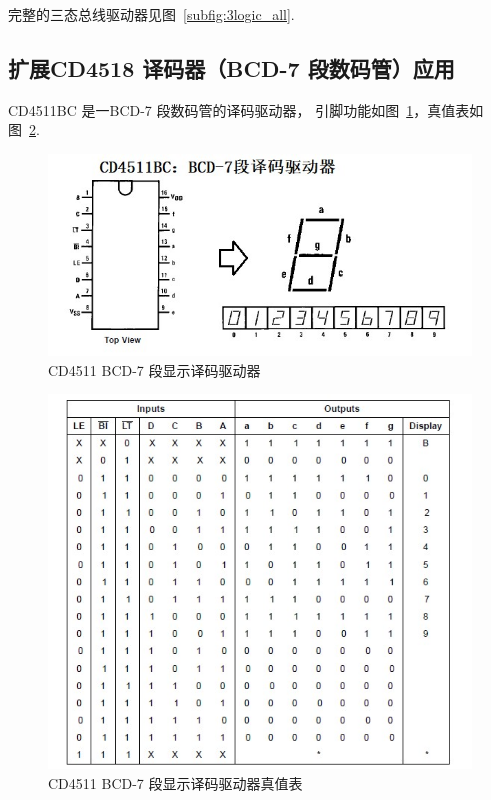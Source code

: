 \documentclass[11pt]{SEU-Digital-Report}
\begin{document}
            完整的三态总线驱动器见图~\ref{subfig:3logic_all}.

        \newpage

        \subsection{扩展CD4518 译码器（BCD-7 段数码管）应用}

            CD4511BC 是一BCD-7 段数码管的译码驱动器， 引脚功能如图~\ref{fig:BCD-7}，真值表如图~\ref{fig:BCD-7-truth-table}.

            \begin{figure}[htbp]
                \centering
                \includegraphics[width=.6\linewidth]{fig/BCD-7.jpg}
                \caption{CD4511 BCD-7 段显示译码驱动器\cite{guide}}
                \label{fig:BCD-7}
            \end{figure}
            \begin{figure}[htbp]
                \centering
                \includegraphics[width=.7\linewidth]{fig/BCD-7-truth-table.jpg}
                \caption{CD4511 BCD-7 段显示译码驱动器真值表\cite{guide}}
                \label{fig:BCD-7-truth-table}
            \end{figure}
\end{document}
